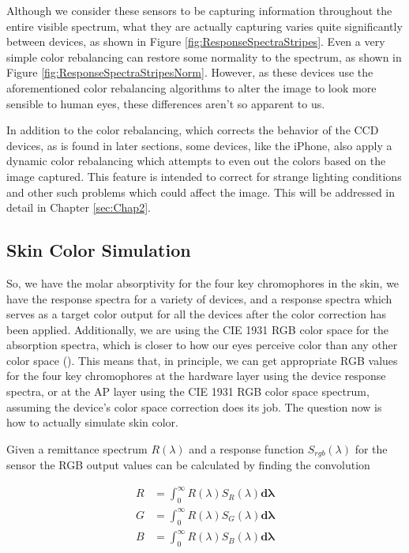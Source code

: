 Although we consider these sensors to be capturing information throughout the entire visible spectrum, what they are actually capturing varies quite significantly between devices, as shown in Figure \ref{fig:ResponseSpectraStripes}. Even a very simple color rebalancing can restore some normality to the spectrum, as shown in Figure \ref{fig:ResponseSpectraStripesNorm}. However, as these devices use the aforementioned color rebalancing algorithms to alter the image to look more sensible to human eyes, these differences aren't so apparent to us.

In addition to the color rebalancing, which corrects the behavior of the CCD devices, as is found in later sections, some devices, like the iPhone, also apply a dynamic color rebalancing which attempts to even out the colors based on the image captured. This feature is intended to correct for strange lighting conditions and other such problems which could affect the image. This will be addressed in detail in Chapter \ref{sec:Chap2}.


\subsection{Skin Color Simulation} \label{sec:SkinColorSimulation}

So, we have the molar absorptivity for the four key chromophores in the skin, we have the response spectra for a variety of devices, and a response spectra which serves as a target color output for all the devices after the color correction has been applied. Additionally, we are using the CIE 1931 RGB color space for the absorption spectra, which is closer to how our eyes perceive color than any other color space (\cite{RIDI2013}). This means that, in principle, we can get appropriate RGB values for the four key chromophores at the hardware layer using the device response spectra, or at the AP layer using the CIE 1931 RGB color space spectrum, assuming the device's color space correction does its job. The question now is how to actually simulate skin color.

Given a remittance spectrum $R(\lambda)$ and a response function $S_{rgb}(\lambda)$ for the sensor the RGB output values can be calculated by finding the convolution 

\begin{align}
R & = \int_{0}^{\infty} R(\lambda) S_{R} (\lambda)  \mathbf{d\lambda}\\
G & = \int_{0}^{\infty} R(\lambda) S_{G} (\lambda) \mathbf{d\lambda}\\
B & = \int_{0}^{\infty} R(\lambda) S_{B} (\lambda)  \mathbf{d\lambda}
\end{align}

